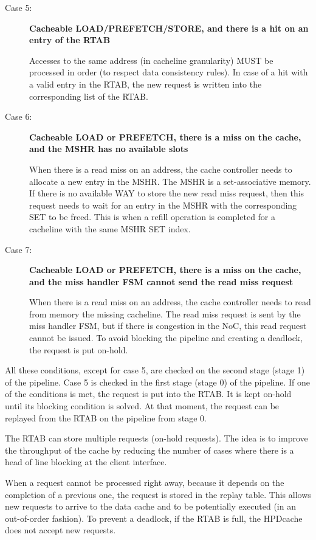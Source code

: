 \documentclass[10pt,titlepage,twoside]{book}
\begin{document}
\begin{description}
  \item[Case 5:] \textbf{Cacheable LOAD/PREFETCH/STORE, and there is a hit on an entry of the \ac{RTAB}}

Accesses to the same address (in cacheline granularity) MUST be processed in order (to respect data consistency rules).
In case of a hit with a valid entry in the \ac{RTAB}, the new request is written into the corresponding list of the \ac{RTAB}.

  \item[Case 6:] \textbf{Cacheable LOAD or PREFETCH, there is a miss on the cache, and the \acs{MSHR} has no available slots}

When there is a read miss on an address, the cache controller needs to allocate a new entry in the \acs{MSHR}.
The \acs{MSHR} is a set-associative memory.
If there is no available WAY to store the new read miss request, then this request needs to wait for an entry in the \ac{MSHR} with the corresponding SET to be freed.
This is when a refill operation is completed for a cacheline with the same \acs{MSHR} SET index.

  \item[Case 7:] \textbf{Cacheable LOAD or PREFETCH, there is a miss on the cache, and the miss handler FSM cannot send the read miss request}

When there is a read miss on an address, the cache controller needs to read from memory the missing cacheline.
The read miss request is sent by the miss handler FSM, but if there is congestion in the \ac{NoC}, this read request cannot be issued.
To avoid blocking the pipeline and creating a deadlock, the request is put on-hold.

\end{description}

All these conditions, except for case 5, are checked on the second stage (stage 1) of the pipeline.
Case 5 is checked in the first stage (stage 0) of the pipeline.
If one of the conditions is met, the request is put into the \ac{RTAB}.
It is kept on-hold until its blocking condition is solved.
At that moment, the request can be replayed from the \ac{RTAB} on the pipeline from stage 0.

The \ac{RTAB} can store multiple requests (on-hold requests).
The idea is to improve the throughput of the cache by reducing the number of cases where there is a head of line blocking at the client interface.

When a request cannot be processed right away, because it depends on the completion of a previous one, the request is stored in the replay table.
This allows new requests to arrive to the data cache and to be potentially executed (in an out-of-order fashion).
To prevent a deadlock, if the \ac{RTAB} is full, the \ac{HPDcache} does not accept new requests.
\end{document}
